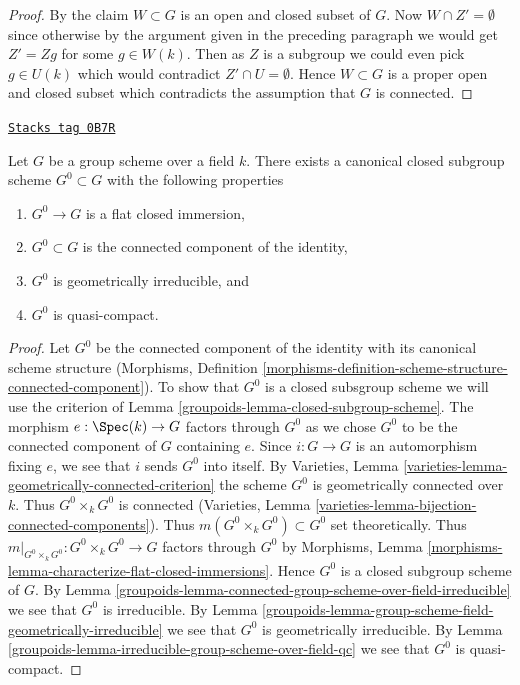 \begin{proof}
\medskip\noindent
By the claim $W \subset G$ is an open and closed subset of $G$.
Now $W \cap Z' = \emptyset$ since otherwise by the argument given in
the preceding paragraph we would get $Z' = Zg$ for some $g \in W(k)$.
Then as $Z$ is a subgroup we could even pick $g \in U(k)$ which would
contradict $Z' \cap U = \emptyset$. Hence $W \subset G$ is a proper open
and closed subset which contradicts the assumption that $G$ is connected.
\end{proof}

\begin{proposition}
\label{groupoids-proposition-connected-component}
\href{https://stacks.math.columbia.edu/tag/0B7R}{\texttt{Stacks tag 0B7R}}

Let $G$ be a group scheme over a field $k$. There exists a canonical closed
subgroup scheme $G^0 \subset G$ with the following properties
\begin{enumerate}
\item $G^0 \to G$ is a flat closed immersion,
\item $G^0 \subset G$ is the connected component of the identity,
\item $G^0$ is geometrically irreducible, and
\item $G^0$ is quasi-compact.
\end{enumerate}
\end{proposition}

\begin{proof}

Let $G^0$ be the connected component of the identity with its canonical
scheme structure (Morphisms, Definition
\ref{morphisms-definition-scheme-structure-connected-component}).
To show that $G^0$ is a closed subsgroup scheme we will use the
criterion of Lemma \ref{groupoids-lemma-closed-subgroup-scheme}.
The morphism $e : \Spec(k) \to G$ factors through $G^0$ as we chose
$G^0$ to be the connected component of $G$ containing $e$.
Since $i : G \to G$ is an automorphism fixing $e$, we see that
$i$ sends $G^0$ into itself.
By Varieties, Lemma \ref{varieties-lemma-geometrically-connected-criterion}
the scheme $G^0$ is geometrically connected over $k$.
Thus $G^0 \times_k G^0$ is connected
(Varieties, Lemma \ref{varieties-lemma-bijection-connected-components}).
Thus $m(G^0 \times_k G^0) \subset G^0$ set theoretically.
Thus $m|_{G^0 \times_k G^0} : G^0 \times_k G^0 \to G$
factors through $G^0$ by
Morphisms, Lemma \ref{morphisms-lemma-characterize-flat-closed-immersions}.
Hence $G^0$ is a closed subgroup scheme of $G$.
By Lemma \ref{groupoids-lemma-connected-group-scheme-over-field-irreducible}
we see that $G^0$ is irreducible. By
Lemma \ref{groupoids-lemma-group-scheme-field-geometrically-irreducible}
we see that $G^0$ is geometrically irreducible. By
Lemma \ref{groupoids-lemma-irreducible-group-scheme-over-field-qc}
we see that $G^0$ is quasi-compact.
\end{proof}

